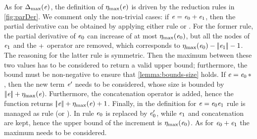 As for ${\Delta_{\max}}({\mathit {e}})$, the definition of ${\eta_{\max}}({\mathit {e}})$ is driven by the reduction rules in \cref{fig:parDer}. We comment only the non-trivial cases: if $\mathit {e}=\mathit {e}_0\mathbin{+}\mathit {e}_1$, then the partial derivative can be obtained
by applying either rule  or . For the former rule,
the partial derivative of $\mathit {e}_0$ can increase of at most ${\eta_{\max}}({\mathit {e}_0})$, but all the nodes of $\mathit {e}_1$ and the $\mathbin{+}$ operator are removed, which corresponds to ${\eta_{\max}}({\mathit {e}_0})-{{\mid\!\mid}}{\mathit {e}_1}{{\mid\!\mid}}-1$. The reasoning for the latter rule is symmetric. Then the maximum between these two values has to be considered to return a valid upper bound; furthermore, the bound must be non-negative to ensure that \cref{lemma:bounds-size} holds.
If $\mathit {e}={{\mathit {e}_0}\mathop{*}}$, then the new term $\mathit {e}'$ needs to be considered, whose size is bounded by ${{\mid\!\mid}}{\mathit {e}}{{\mid\!\mid}}+{\eta_{\max}}({\mathit {e}})$. Furthermore, the concatenation operator is added, hence the function returns ${{\mid\!\mid}}{\mathit {e}}{{\mid\!\mid}}+{\eta_{\max}}({\mathit {e}})+1$. Finally, in the definition for $\mathit {e}=\mathit {e}_0\mathit {e}_1$ rule  is managed as rule  (or ).
In rule  $\mathit {e}_0$ is replaced by $\mathit {e}_0'$, while $\mathit {e}_1$ and concatenation are kept, hence the upper bound of the increment is ${\eta_{\max}}({\mathit {e}_0})$. As for $\mathit {e}_0\mathbin{+}\mathit {e}_1$ the maximum needs to be considered.


